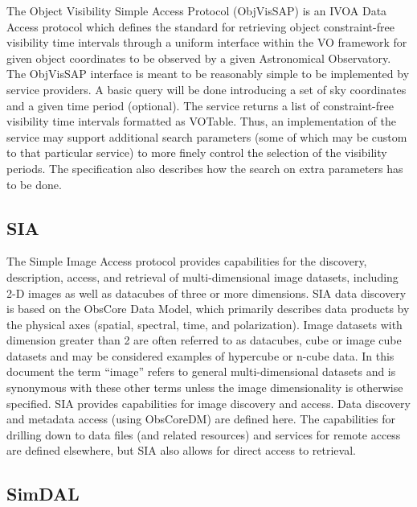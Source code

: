 \documentclass[11pt,a4paper]{ivoa}
\begin{document}
The Object Visibility Simple Access Protocol (ObjVisSAP) is an IVOA Data Access protocol 
which defines the standard for retrieving object constraint-free visibility time intervals 
through a uniform interface within the VO framework for given object coordinates to be 
observed by a given Astronomical Observatory. The ObjVisSAP interface is meant to be 
reasonably simple to be implemented by service providers. A basic query will be done 
introducing a set of sky coordinates and a given time period (optional). The service 
returns a list of constraint-free visibility time intervals formatted as VOTable. Thus, 
an implementation of the service may support additional search parameters (some of which 
may be custom to that particular service) to more finely control the selection of the 
visibility periods. The specification also describes how the search on extra parameters 
has to be done.

\subsection{SIA}

The Simple Image Access protocol provides capabilities for the discovery, description, 
access, and retrieval of multi-dimensional image datasets, including 2-D images as well 
as datacubes of three or more dimensions. SIA data discovery is based on the ObsCore Data 
Model, which primarily describes data products by the physical axes (spatial, spectral, 
time, and polarization). Image datasets with dimension greater than 2 are often referred 
to as datacubes, cube or image cube datasets and may be considered examples of hypercube 
or n-cube data. In this document the term ``image'' refers to general multi-dimensional 
datasets and is synonymous with these other terms unless the image dimensionality is 
otherwise specified. SIA provides capabilities for image discovery and access. Data 
discovery and metadata access (using ObsCoreDM) are defined here. The capabilities for 
drilling down to data files (and related resources) and services for remote access are 
defined elsewhere, but SIA also allows for direct access to retrieval. 

\subsection{SimDAL}
\end{document}

